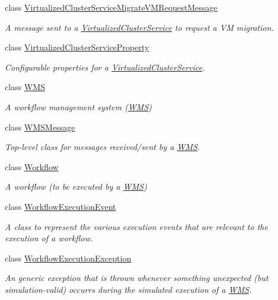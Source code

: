 \begin{DoxyCompactItemize}
class \hyperlink{classwrench_1_1_virtualized_cluster_service_migrate_v_m_request_message}{Virtualized\+Cluster\+Service\+Migrate\+V\+M\+Request\+Message}
\begin{DoxyCompactList}\small\item\em A message sent to a \hyperlink{classwrench_1_1_virtualized_cluster_service}{Virtualized\+Cluster\+Service} to request a VM migration. \end{DoxyCompactList}\item 
class \hyperlink{classwrench_1_1_virtualized_cluster_service_property}{Virtualized\+Cluster\+Service\+Property}
\begin{DoxyCompactList}\small\item\em Configurable properties for a \hyperlink{classwrench_1_1_virtualized_cluster_service}{Virtualized\+Cluster\+Service}. \end{DoxyCompactList}\item 
class \hyperlink{classwrench_1_1_w_m_s}{W\+MS}
\begin{DoxyCompactList}\small\item\em A workflow management system (\hyperlink{classwrench_1_1_w_m_s}{W\+MS}) \end{DoxyCompactList}\item 
class \hyperlink{classwrench_1_1_w_m_s_message}{W\+M\+S\+Message}
\begin{DoxyCompactList}\small\item\em Top-\/level class for messages received/sent by a \hyperlink{classwrench_1_1_w_m_s}{W\+MS}. \end{DoxyCompactList}\item 
class \hyperlink{classwrench_1_1_workflow}{Workflow}
\begin{DoxyCompactList}\small\item\em A workflow (to be executed by a \hyperlink{classwrench_1_1_w_m_s}{W\+MS}) \end{DoxyCompactList}\item 
class \hyperlink{classwrench_1_1_workflow_execution_event}{Workflow\+Execution\+Event}
\begin{DoxyCompactList}\small\item\em A class to represent the various execution events that are relevant to the execution of a workflow. \end{DoxyCompactList}\item 
class \hyperlink{classwrench_1_1_workflow_execution_exception}{Workflow\+Execution\+Exception}
\begin{DoxyCompactList}\small\item\em An generic exception that is thrown whenever something unexpected (but simulation-\/valid) occurrs during the simulated execution of a \hyperlink{classwrench_1_1_w_m_s}{W\+MS}. \end{DoxyCompactList}\item 

\end{DoxyCompactItemize}
